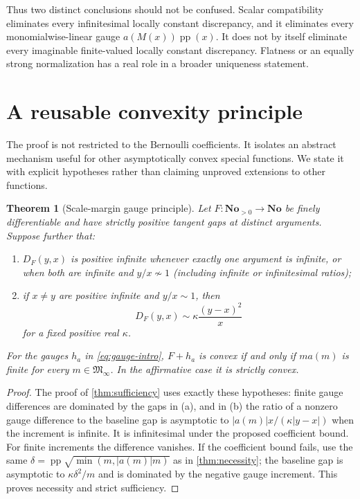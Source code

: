 \documentclass[11pt,letterpaper]{article}
\numberwithin{equation}{section}
\newtheorem{theorem}{Theorem}[section]
\theoremstyle{plain}
\theoremstyle{definition}
\theoremstyle{remark}
\newcommand{\No}{\mathbf{No}}
\newcommand{\Minf}{\mathfrak M_{\infty}}
\newcommand{\pp}{\operatorname{pp}}
\newcommand{\abs}[1]{\lvert#1\rvert}
\begin{document}
Thus two distinct conclusions should not be confused. Scalar compatibility
eliminates every infinitesimal locally constant discrepancy, and it
eliminates every monomialwise-linear gauge $a(M(x))\pp(x)$.
It does not by itself eliminate every imaginable finite-valued locally
constant discrepancy. Flatness or an equally strong normalization has a real
role in a broader uniqueness statement.

\section{A reusable convexity principle}\label{sec:general-principle}
The proof is not restricted to the Bernoulli coefficients. It isolates an
abstract mechanism useful for other asymptotically convex special functions.
We state it with explicit hypotheses rather than claiming unproved
extensions to other functions.

\begin{theorem}[Scale-margin gauge principle]\label{thm:abstract}
Let $F:\No_{>0}\to\No$ be finely differentiable and have strictly
positive tangent gaps at distinct arguments. Suppose further that:
\begin{enumerate}[label=(\alph*)]
\item $D_F(y,x)$ is positive infinite whenever exactly one argument is
infinite, or when both are infinite and $y/x\not\sim1$ (including
infinite or infinitesimal ratios);
\item if $x\ne y$ are positive infinite and $y/x\sim1$, then
\[
 D_F(y,x)\sim\kappa\frac{(y-x)^2}{x}
\]
for a fixed positive real $\kappa$.
\end{enumerate}
For the gauges $h_a$ in \eqref{eq:gauge-intro},
$F+h_a$ is convex if and only if $m a(m)$ is finite for every
$m\in\Minf$. In the affirmative case it is strictly convex.
\end{theorem}
\begin{proof}
The proof of \cref{thm:sufficiency} uses exactly these hypotheses:
finite gauge differences are dominated by the gaps in (a), and in (b) the
ratio of a nonzero gauge difference to the baseline gap is asymptotic to
$\abs{a(m)}x/(\kappa\abs{y-x})$ when the increment is infinite.
It is infinitesimal under the proposed coefficient bound. For finite
increments the difference vanishes.
If the coefficient bound fails, use the same
$\delta=\pp\sqrt{\min(m,\abs{a(m)}m)}$ as in
\cref{thm:necessity}; the baseline gap is asymptotic to
$\kappa\delta^2/m$ and is dominated by the negative gauge increment.
This proves necessity and strict sufficiency.
\end{proof}
\end{document}
